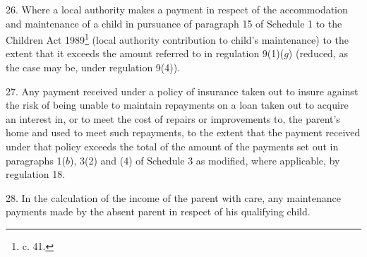 \documentclass[12pt,a4paper]{article}
\begin{document}

\medskip

26.  Where a local authority makes a payment in respect of the accommodation and maintenance of a child in pursuance of paragraph 15 of Schedule 1 to the Children Act 1989\footnote{ c. 41.} (local authority contribution to child’s maintenance) to the extent that it exceeds the amount referred to in 
regulation 9(1)($g$) %
(reduced, as the case may be, under regulation 9(4)).


\medskip

27.  Any payment received under a policy of insurance taken out to insure against the risk of being unable to maintain repayments on a loan taken out to acquire an interest in, or to meet the cost of repairs or improvements to, the parent’s home and used to meet such repayments, to the extent that the payment received under that policy 
exceeds  %
%
%
the total of the amount of the payments set out in paragraphs 1($b$), 3(2) and (4) of Schedule 3 as modified, where applicable, by regulation 18.  %


\medskip

28.  In the calculation of the income of the parent with care, any maintenance payments made by the absent parent in respect of his qualifying child.

\medskip
\end{document}
